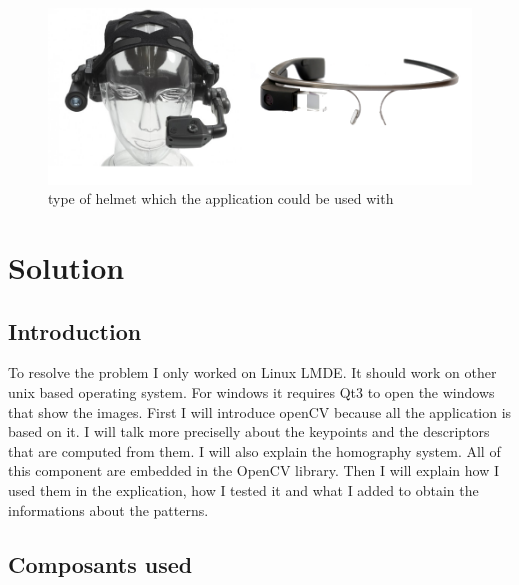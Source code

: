 \documentclass[english,a4paper,11pt]{report}
\begin{document}
		\begin{figure}[h]
			\begin{center}
				\includegraphics[scale=0.41]{images_not_compressed/helmet.png}
				\caption{type of helmet which the application could be used with}
			\end{center}
		\end{figure}
	
		
	\chapter{Solution}
	\section{Introduction}
	\par To resolve the problem I only worked on Linux LMDE. It should work on other unix based operating system. For windows it requires Qt3 to open the windows that show the images.
	First I will introduce openCV because all the application is based on it. I will talk more preciselly about the keypoints and the descriptors that are computed from them. I will also explain the homography system. All of this component are embedded in the OpenCV library.
	Then I will explain how I used them in the explication, how I tested it and what I added to obtain the informations about the patterns.
	
	\section{Composants used}
	
\end{document}
